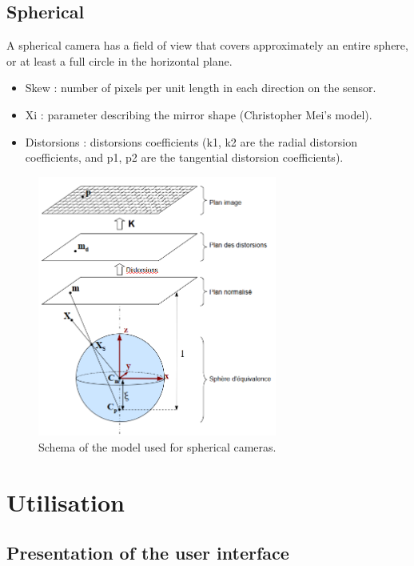 \documentclass{article}
\begin{document}
\newpage
\subsection{Spherical}

A spherical camera has a field of view that covers approximately an entire sphere, or at least a full circle in the horizontal plane.

\begin{itemize}
    \item Skew : number of pixels per unit length in each direction on the sensor. 
    \item Xi : parameter describing the mirror shape (Christopher Mei's model).
    \item Distorsions : distorsions coefficients (k1, k2 are the radial distorsion coefficients, and p1, p2 are the tangential distorsion coefficients). 
\end{itemize}

\begin{figure}[H]
\centering
\includegraphics[width=0.7\textwidth]{omni_schema.png}
\caption{\label{fig:omni_schema}Schema of the model used for spherical cameras.}
\end{figure}

\section{Utilisation}

\subsection{Presentation of the user interface}
\end{document}
